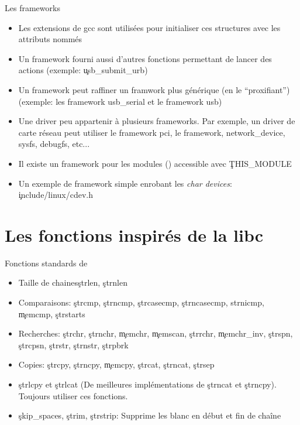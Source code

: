 \begin{frame}[fragile=singleslide]{Les frameworks}
  \begin{itemize}
  \item  Les extensions  de gcc  sont utilisées  pour  initialiser ces
    structures avec les attributs nommés
  \item  Un framework  fourni aussi  d'autres fonctions  permettant de
    lancer des actions (exemple: \c{usb_submit_urb})
  \item Un  framework peut raffiner  un framwork plus générique  (en le
    ``proxifiant'')   (exemple:  les   framework  usb\_serial   et  le
    framework usb)
  \item Une driver peu appartenir à plusieurs frameworks. Par exemple,
    un  driver de  carte réseau  peut  utiliser le  framework pci,  le
    framework, network\_device, sysfs, debugfs, etc...
  \item    Il     existe    un    framework     pour    les    modules
    () accessible avec \c{THIS_MODULE}
  \item  Un  exemple  de   framework  simple  enrobant  les  \emph{char
      devices}: \c{include/linux/cdev.h}
  \end{itemize}
\end{frame}

\section{Les fonctions inspirés de la libc}

\begin{frame}{Fonctions standards de }
  \begin{itemize}
  \item Taille de chaines\c{strlen}, \c{strnlen}
  \item   Comparaisons:   \c{strcmp},   \c{strncmp},   \c{strcasecmp},
    \c{strncasecmp}, \c{ strnicmp}, \c{memcmp}, \c{strstarts}
  \item Recherches:  \c{strchr}, \c{strnchr}, \c{memchr}, \c{memscan},
    \c{strrchr},  \c{memchr_inv}, \c{strspn},  \c{strcpsn}, \c{strstr},
    \c{strnstr}, \c{strpbrk}
  \item  Copies:   \c{strcpy},  \c{strncpy},  \c{memcpy},  \c{strcat},
    \c{strncat}, \c{strsep}
  \item \c{strlcpy}  et \c{strlcat} (De  meilleures implémentations de
    \c{strncat} et \c{strncpy}). Toujours utiliser ces fonctions.
  \item \c{skip_spaces},  \c{strim}, \c{strstrip}: Supprime  les blanc
    en début et fin de chaîne
  \end{itemize}
\end{frame}

